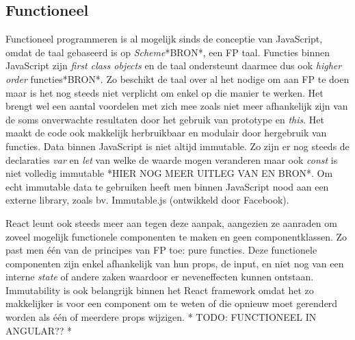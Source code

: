 \subsection{Functioneel}
Functioneel programmeren is al mogelijk sinds de conceptie van JavaScript, omdat de taal gebaseerd is op \textit{Scheme}*BRON*, een FP taal. Functies binnen JavaScript zijn \textit{first class objects} en de taal ondersteunt daarmee dus ook \textit{higher order} functies*BRON*. Zo beschikt de taal over al het nodige om aan FP te doen maar is het nog steeds niet verplicht om enkel op die manier te werken. Het brengt wel een aantal voordelen met zich mee zoals niet meer afhankelijk zijn van de soms onverwachte resultaten door het gebruik van prototype en \textit{this}. Het maakt de code ook makkelijk herbruikbaar en modulair door hergebruik van functies. Data binnen JavaScript is niet altijd immutable. Zo zijn er nog steeds de declaraties \textit{var} en \textit{let} van welke de waarde mogen veranderen maar ook \textit{const} is niet volledig immutable *HIER NOG MEER UITLEG VAN EN BRON*. Om echt immutable data te gebruiken heeft men binnen JavaScript nood aan een externe library, zoals bv. Immutable.js (ontwikkeld door Facebook).

React leunt ook steeds meer aan tegen deze aanpak, aangezien ze aanraden om zoveel mogelijk functionele componenten te maken en geen componentklassen. Zo past men één van de principes van FP toe: pure functies. Deze functionele componenten zijn enkel afhankelijk van hun props, de input, en niet nog van een interne \textit{state} of andere zaken waardoor er neveneffecten kunnen ontstaan. Immutability is ook belangrijk binnen het React framework omdat het zo makkelijker is voor een component om te weten of die opnieuw moet gerenderd worden als één of meerdere props wijzigen. * TODO: FUNCTIONEEL IN ANGULAR?? *